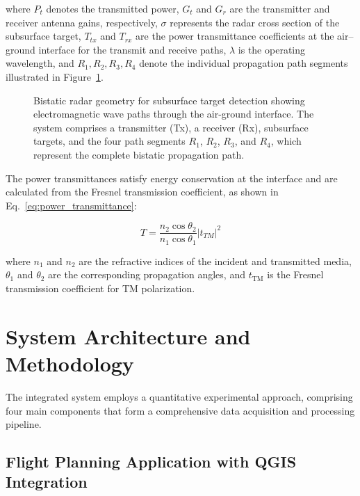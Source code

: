 \documentclass[conference]{IEEEtran}
\begin{document}
where $P_t$ denotes the transmitted power, $G_t$ and $G_r$ are the transmitter and receiver antenna gains, respectively, $\sigma$ represents the radar cross section of the subsurface target, $T_{tx}$ and $T_{rx}$ are the power transmittance coefficients at the air–ground interface for the transmit and receive paths, $\lambda$ is the operating wavelength, and $R_1, R_2, R_3, R_4$ denote the individual propagation path segments illustrated in Figure~\ref{fig:bistatic_geometry}.

\begin{figure}[ht]
\centering
\scalebox{0.6}{}
\caption{Bistatic radar geometry for subsurface target detection showing electromagnetic wave paths through the air-ground interface. The system comprises a transmitter (Tx), a receiver (Rx), subsurface targets, and the four path segments $R_1$, $R_2$, $R_3$, and $R_4$, which represent the complete bistatic propagation path.}
\label{fig:bistatic_geometry}
\end{figure}

The power transmittances satisfy energy conservation at the interface and are calculated from the Fresnel transmission coefficient, as shown in Eq.~\ref{eq:power_transmittance}:

\begin{equation}
T = \frac{n_2 \cos \theta_2}{n_1 \cos \theta_1} |t_{TM}|^2
\label{eq:power_transmittance}
\end{equation}

where $n_1$ and $n_2$ are the refractive indices of the incident and transmitted media, $\theta_1$ and $\theta_2$ are the corresponding propagation angles, and $t_{\mathrm{TM}}$ is the Fresnel transmission coefficient for TM polarization.

\section{System Architecture and Methodology}

The integrated system employs a quantitative experimental approach, comprising four main components that form a comprehensive data acquisition and processing pipeline.

\subsection{Flight Planning Application with QGIS Integration}
\end{document}
